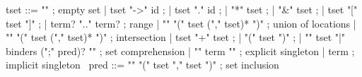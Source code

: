 \begin{syntax}
  tset ::= "\empty" ; empty set
       | tset "->" id ;
       | tset "." id ;
       | "*" tset ;
       | "&" tset ;
       | tset "[" tset "]" ;
       | term? ".." term? ; range
       | "\union" "(" tset ("," tset)* ")" ; union of locations
       | "\inter" "(" tset ("," tset)* ")" ; intersection
       | tset "+" tset ;
       | "(" tset ")" ;
       | "{" tset "|" binders (";" pred)? "}" ; set comprehension
       | { "{" term "}" } ; explicit singleton
       | term ; implicit singleton
       \
  pred ::= {"\subset" "(" tset "," tset ")"} ; set inclusion
\end{syntax}

